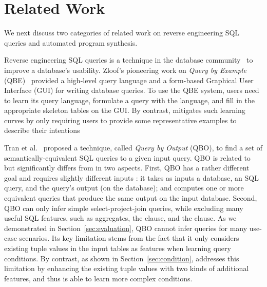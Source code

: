 
\section{Related Work}
\label{sec:related}

\vspace{-1mm}

\enlargethispage{5pt}

We next discuss two categories
of related work on reverse engineering SQL queries 
and automated program synthesis.



Reverse engineering SQL queries is a technique in the database
community~\cite{Zloof:1975, Tran:2009, DasSarma:2010} to
improve a database's usability. 
Zloof's pioneering work on \textit{Query by Example} (QBE)~\cite{Zloof:1975}
provided a high-level query language and a
form-based Graphical User Interface (GUI) for
writing database queries. To use the QBE system, 
users need to learn its query language,
formulate a query with the language, and fill in
the appropriate skeleton tables on the GUI.
By contrast, \ourtool mitigates such learning curves
by only requiring users to provide some representative
examples to describe their intentions




Tran et al.~\cite{Tran:2009} proposed a technique,
called \textit{Query by Output} (QBO), 
to find a set of semantically-equivalent SQL queries
to a given input query. QBO is related to but
significantly differs from \ourtool in two aspects.
First, QBO has a rather different goal and requires
slightly different inputs : it takes as inputs a database,
an SQL query, and the query's output (on the database); and computes
one or more equivalent queries that produce the
same output on the input database.
Second, QBO can only infer simple select-project-join queries,
while excluding many useful SQL features, such as aggregates,
the  clause, and the 
clause. As we demonstrated in Section~\ref{sec:evaluation},
QBO cannot infer queries for many use-case scenarios.
Its key limitation stems from the fact that it
only considers existing tuple values
in the input tables as features when learning
query conditions. 
By contrast, as shown in Section~\ref{sec:condition},
\ourtool addresses this limitation by enhancing
the existing tuple values with two kinds of
additional features, and thus is able to learn more
complex conditions.


